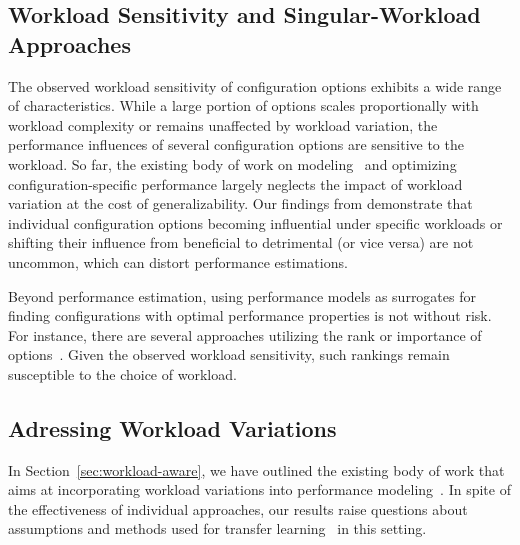 {{{\subsection{Workload Sensitivity and Singular-Workload Approaches}
The observed workload sensitivity of configuration options exhibits a wide range of characteristics. While a large portion of options scales proportionally with workload complexity or remains unaffected by workload variation, the performance influences of several configuration options are sensitive to the workload.  So far, the existing body of work on modeling~\cite{dorn2020,siegmundPerformanceinfluenceModelsHighly2015,haDeepPerf2019,perfAL,guoVariabilityawarePerformancePrediction2013,sarkarCostEfficientSamplingPerformance,guo_2018_data,fourier_learning_2015,perLasso} and optimizing~\cite{chen_mmo_2021,nairUsingBadLearners2017,nairFlash18,ohFindingNearoptimalConfigurations2017} configuration-specific performance largely neglects the impact of workload variation at the cost of generalizability. 
Our findings from  demonstrate that individual configuration options becoming influential under specific workloads or shifting their influence from beneficial to detrimental (or vice versa) are not uncommon, which can distort performance estimations.

Beyond performance estimation, using performance models as surrogates for finding configurations with optimal performance properties is not without risk. For instance, there are several approaches utilizing the rank or importance of options~\cite{nairUsingBadLearners2017,ohFindingNearoptimalConfigurations2017}. Given the observed workload sensitivity, such rankings remain susceptible to the choice of workload.



\subsection{Adressing Workload Variations}
In Section~\ref{sec:workload-aware}, we have outlined the existing body of work that aims at incorporating workload variations into performance modeling~\cite{koc_satune_2021,jamishidi_transfer_2017,jamshidi_learning_2018,jamshidi_transfer_gp_2017}. In spite of the effectiveness of individual approaches, our results raise questions about assumptions and methods used for transfer learning~\cite{jamshidi_learning_2018,jamishidi_transfer_2017} in this setting. 

}}}
